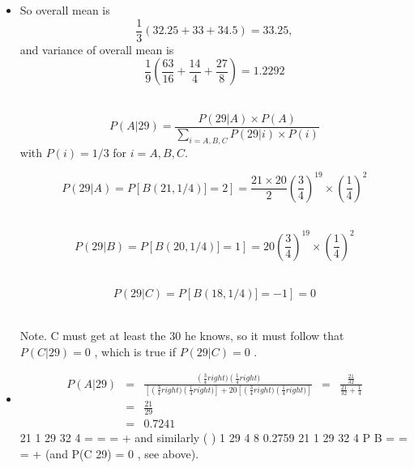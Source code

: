 \documentclass[a4paper,12pt]{article}
\begin{document}
\begin{enumerate}[(a)]
\begin{itemize}
\item So overall mean is 
\[ \frac{1}{3}  (32.25 + 33  + 34.5) = 33.25,\]
and variance of overall mean is 
\[ \frac{1}{9}  (\frac{63}{16} + \frac{14}{4}  + \frac{27}{8}) = 1.2292\] 



\[ P(A|29) = \frac{P(29|A) \times P(A)}{ \sum_{i=A,B,C} P(29|i) \times P(i)}\]
with $P(i) = 1/3$ for $i = A,B,C$.


\[ P(29|A) =  P \left[ B(21,1/4)] = 2  \right]  = \frac{21 \times 20}{2} \left(  \frac{3}{4}\right)^{19} \times \left(  \frac{1}{4}\right)^2\] 

\[ P(29|B) =  P \left[ B(20,1/4)] = 1  \right]  = 20 \left(  \frac{3}{4}\right)^{19} \times \left(  \frac{1}{4}\right)^2\]      

\[ P(29|C) =  P \left[ B(18,1/4)] = -1  \right]  = 0 \]   

Note. C must get at least the 30 he knows, so it must follow that
  $P(C| 29) = 0$ , which is true if $P(29|C) = 0$ .


\item  
\begin{eqnarray*}
P(A|29) &=&  
\frac{  \left(\frac{3}{4}right) \left(\frac{1}{4}right) }{\left[\left(\frac{3}{4}right) \left(\frac{1}{4}right)\right] + 20 \left[ \left(\frac{3}{4}right) \left(\frac{1}{4}right) \right] }  

&=& \frac{ \frac{21}{32} }{ \frac{21}{32} + \frac{1}{4}} \\
&=& \frac{ 21 }{ 29 } \\
&=& 0.7241
\end{eqnarray*}
 21 1 29
32 4
= = =
  +
  and similarly
( )
1
29 4 8 0.2759 21 1 29
32 4
P B = = =
  +
  (and P(C 29) = 0 , see above).
\end{itemize}

\end{enumerate}
\end{document}
